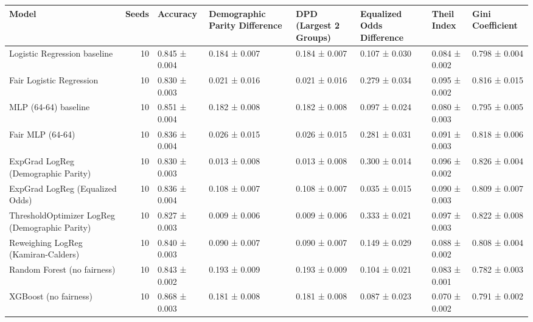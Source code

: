 \begin{tabular}{lrllllll}
\toprule
Model & Seeds & Accuracy & Demographic Parity Difference & DPD (Largest 2 Groups) & Equalized Odds Difference & Theil Index & Gini Coefficient \\
\midrule
Logistic Regression baseline & 10 & 0.845 ± 0.004 & 0.184 ± 0.007 & 0.184 ± 0.007 & 0.107 ± 0.030 & 0.084 ± 0.002 & 0.798 ± 0.004 \\
Fair Logistic Regression & 10 & 0.830 ± 0.003 & 0.021 ± 0.016 & 0.021 ± 0.016 & 0.279 ± 0.034 & 0.095 ± 0.002 & 0.816 ± 0.015 \\
MLP (64-64) baseline & 10 & 0.851 ± 0.004 & 0.182 ± 0.008 & 0.182 ± 0.008 & 0.097 ± 0.024 & 0.080 ± 0.003 & 0.795 ± 0.005 \\
Fair MLP (64-64) & 10 & 0.836 ± 0.004 & 0.026 ± 0.015 & 0.026 ± 0.015 & 0.281 ± 0.031 & 0.091 ± 0.003 & 0.818 ± 0.006 \\
ExpGrad LogReg (Demographic Parity) & 10 & 0.830 ± 0.003 & 0.013 ± 0.008 & 0.013 ± 0.008 & 0.300 ± 0.014 & 0.096 ± 0.002 & 0.826 ± 0.004 \\
ExpGrad LogReg (Equalized Odds) & 10 & 0.836 ± 0.004 & 0.108 ± 0.007 & 0.108 ± 0.007 & 0.035 ± 0.015 & 0.090 ± 0.003 & 0.809 ± 0.007 \\
ThresholdOptimizer LogReg (Demographic Parity) & 10 & 0.827 ± 0.003 & 0.009 ± 0.006 & 0.009 ± 0.006 & 0.333 ± 0.021 & 0.097 ± 0.003 & 0.822 ± 0.008 \\
Reweighing LogReg (Kamiran-Calders) & 10 & 0.840 ± 0.003 & 0.090 ± 0.007 & 0.090 ± 0.007 & 0.149 ± 0.029 & 0.088 ± 0.002 & 0.808 ± 0.004 \\
Random Forest (no fairness) & 10 & 0.843 ± 0.002 & 0.193 ± 0.009 & 0.193 ± 0.009 & 0.104 ± 0.021 & 0.083 ± 0.001 & 0.782 ± 0.003 \\
XGBoost (no fairness) & 10 & 0.868 ± 0.003 & 0.181 ± 0.008 & 0.181 ± 0.008 & 0.087 ± 0.023 & 0.070 ± 0.002 & 0.791 ± 0.002 \\
\bottomrule
\end{tabular}
